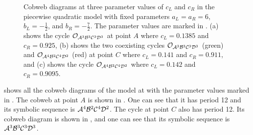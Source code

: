 \begin{figure}
	\centering
	\caption[Cobweb diagrams of the skewed piecewise quadratic model]{
		Cobweb diagrams at three parameter values of $c_L$ and $c_R$ in the piecewise quadratic model with fixed parameters $a_L = a_R = 6$, $b_L = -\frac{1}{2}$, and $b_R = -\frac{7}{2}$.
		The parameter values are marked in .
		(a) shows the cycle $\mathcal{O}_{\mathcal{A}^3\mathcal{B}^3\mathcal{C}^3\mathcal{D}^3}$ at point $A$ where $c_L = 0.1385$ and $c_R = 0.925$,
		(b) shows the two coexisting cycles $\mathcal{O}_{\mathcal{A}^3\mathcal{B}^3\mathcal{C}^3\mathcal{D}^3}$ (green) and $\mathcal{O}_{\mathcal{A}^4\mathcal{B}^2\mathcal{C}^4\mathcal{D}^2}$ (red) at point $C$ where $c_L = 0.141$ and $c_R = 0.911$,
		and (c) shows the cycle $\mathcal{O}_{\mathcal{A}^4\mathcal{B}^2\mathcal{C}^4\mathcal{D}^2}$ where $c_L = 0.142$ and $c_R = 0.9095$.
	}
	\label{fig:setup.quad.skew.cobwebs}
\end{figure}

 shows all the cobweb diagrams of the model at with the parameter values marked in .
The cobweb at point $A$ is shown in .
One can see that it has period 12 and its symbolic sequence is $\mathcal{A}^4\mathcal{B}^2\mathcal{C}^4\mathcal{D}^2$.
The cycle at point $C$ also has period 12.
Its cobweb diagram is shown in , and one can see that its symbolic sequence is $\mathcal{A}^3\mathcal{B}^3\mathcal{C}^3\mathcal{D}^3$.

